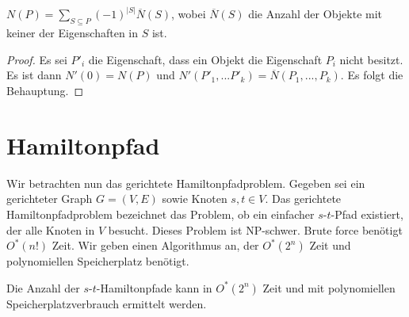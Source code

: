   \begin{corollary}
    \(N(P) = \sum_{S \subseteq P} (-1)^{|S|}\overline{N}(S)\), wobei \(\overline{N}(S)\) die Anzahl der Objekte mit keiner der Eigenschaften in \(S\) ist.
  \end{corollary}
  
  \begin{proof}
    Es sei \(P'_i\) die Eigenschaft, dass ein Objekt die Eigenschaft \(P_i\) nicht besitzt. Es ist dann \(N'(0) = N(P)\) und \(N'(P'_1, ... P'_k) = \overline{N}(P_1,...,P_k)\). Es folgt die Behauptung.
  \end{proof}
  
\section{Hamiltonpfad}
  Wir betrachten nun das gerichtete Hamiltonpfadproblem. Gegeben sei ein gerichteter Graph \(G = (V,E)\) sowie Knoten \(s,t \in V\). Das gerichtete Hamiltonpfadproblem bezeichnet das Problem, ob ein einfacher \(s\)-\(t\)-Pfad existiert, der alle Knoten in \(V\) besucht. Dieses Problem ist NP-schwer. Brute force benötigt \(O^*(n!)\) Zeit. Wir geben einen Algorithmus an, der \(O^*(2^n)\) Zeit und polynomiellen Speicherplatz benötigt.
  
  \begin{theorem}
    Die Anzahl der \(s\)-\(t\)-Hamiltonpfade kann in \(O^*(2^n)\) Zeit und mit polynomiellen Speicherplatzverbrauch ermittelt werden.
  \end{theorem}
  

